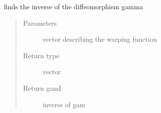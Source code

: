 \documentclass[letterpaper,10pt,english]{sphinxmanual}
\begin{document}

\begin{fulllineitems}
\label{\detokenize{utility_functions:utility_functions.invertGamma}}
finds the inverse of the diffeomorphism gamma
\begin{quote}\begin{description}
\item[{Parameters}] \leavevmode
{} \textendash{} vector describing the warping function

\item[{Return type}] \leavevmode
vector

\item[{Return gamI}] \leavevmode
inverse of gam

\end{description}\end{quote}

\end{fulllineitems}

\end{document}
